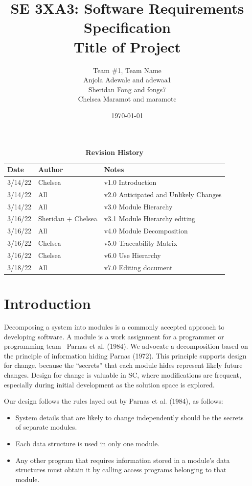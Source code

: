 \documentclass[12pt, titlepage]{article}
\title{SE 3XA3: Software Requirements Specification\\Title of Project}
\author{Team \#1, Team Name
		\\ Anjola Adewale and adewaa1
		\\ Sheridan Fong and fongs7
		\\ Chelsea Maramot and maramotc
}
\date{\today}
\begin{document}
\maketitle

\tableofcontents
\listoftables
\listoffigures

\begin{table}[H]
\caption{\bf Revision History}
\begin{tabularx}{\textwidth}{p{3cm}p{2cm}X}
\toprule {\bf Date} & {\bf Author} & {\bf Notes}\\
\midrule
3/14/22 & Chelsea & v1.0 Introduction \\

3/14/22 & All & v2.0 Anticipated and Unlikely Changes \\
3/14/22 & All & v3.0 Module Hierarchy \\
3/16/22 & Sheridan + Chelsea & v3.1 Module Hierarchy editing \\
3/16/22 & All & v4.0 Module Decomposition \\
3/16/22 & Chelsea & v5.0 Traceability Matrix \\
3/16/22 & Chelsea & v6.0 Use Hierarchy \\
3/18/22 & All & v7.0 Editing document \\
\bottomrule
\end{tabularx}
\end{table}

\newpage


\section{Introduction}

Decomposing a system into modules is a commonly accepted approach to developing
software.  A module is a work assignment for a programmer or programming
team~ Parnas et al. (1984).  We advocate a decomposition
based on the principle of information hiding Parnas (1972).  This
principle supports design for change, because the ``secrets'' that each module
hides represent likely future changes.  Design for change is valuable in SC,
where modifications are frequent, especially during initial development as the
solution space is explored.  

Our design follows the rules layed out by Parnas et al. (1984), as follows:
\begin{itemize}
\item System details that are likely to change independently should be the
  secrets of separate modules.
\item Each data structure is used in only one module.
\item Any other program that requires information stored in a module's data
  structures must obtain it by calling access programs belonging to that module.
\end{itemize}
\end{document}
